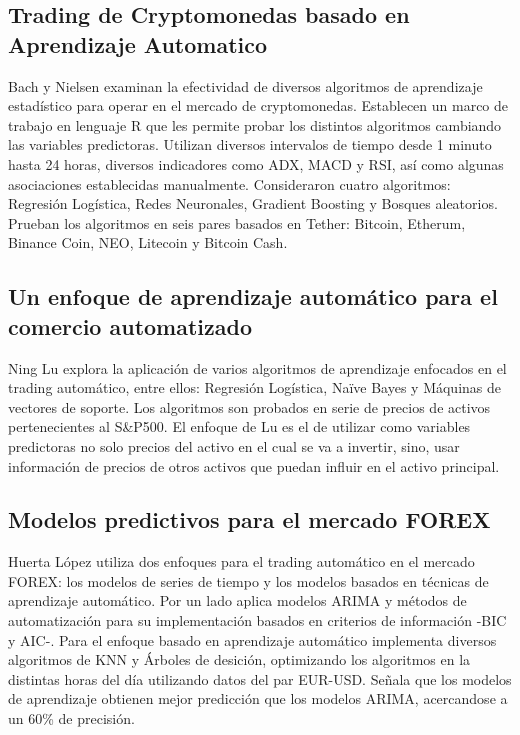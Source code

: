 \documentclass[a4paper,12pt]{Latex/Classes/PhDthesisPSnPDF}
\begin{document}
\subsection{Trading de Cryptomonedas basado en Aprendizaje Automatico}

Bach y Nielsen examinan la efectividad de diversos algoritmos de aprendizaje estadístico para operar en el mercado de cryptomonedas. Establecen un marco de trabajo en lenguaje R que les permite probar los distintos algoritmos cambiando las variables predictoras. Utilizan diversos intervalos de tiempo desde 1 minuto hasta 24 horas, diversos indicadores como ADX, MACD y RSI, así como algunas asociaciones establecidas manualmente. Consideraron cuatro algoritmos: Regresión Logística, Redes Neuronales, Gradient Boosting y Bosques aleatorios. Prueban los algoritmos en seis pares basados en Tether: Bitcoin, Etherum, Binance Coin, NEO, Litecoin y Bitcoin Cash.

\subsection{Un enfoque de aprendizaje automático para el comercio automatizado}

Ning Lu explora la aplicación de varios algoritmos de aprendizaje enfocados en el trading automático, entre ellos: Regresión Logística, Naïve Bayes y Máquinas de vectores de soporte. Los algoritmos son probados en serie de precios de activos pertenecientes al S\&P500. El enfoque de Lu es el de utilizar como variables predictoras no solo precios del activo en el cual se va a invertir, sino, usar información de precios de otros activos que puedan influir en el activo principal.

\subsection{Modelos predictivos para el mercado FOREX}

Huerta López utiliza dos enfoques para el trading automático en el mercado FOREX: los modelos de series de tiempo y los modelos basados en técnicas de aprendizaje automático. Por un lado aplica modelos ARIMA y métodos de automatización para su implementación basados en criterios de información -BIC y AIC-. Para el enfoque basado en aprendizaje automático implementa diversos algoritmos de KNN y Árboles de desición, optimizando los algoritmos en la distintas horas del día utilizando datos del par EUR-USD. Señala que los modelos de aprendizaje obtienen mejor predicción que los modelos ARIMA, acercandose a un 60\% de precisión.
\end{document}
